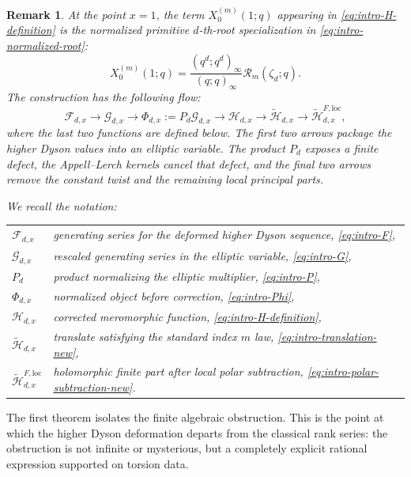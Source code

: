 \documentclass[12pt]{amsart}
\numberwithin{equation}{section}
\newtheorem{remark}{Remark}
\newcommand{\RRm}{\mathcal R}
\begin{document}
\medskip
\begin{remark}
At the point \(x=1\), the term \(X_0^{(m)}(1;q)\) appearing in
\eqref{eq:intro-H-definition} is the normalized primitive
\(d\)-th-root specialization in \eqref{eq:intro-normalized-root}:
\[
X_0^{(m)}(1;q)=
\frac{(q^d;q^d)_\infty}{(q;q)_\infty}\RRm_m(\zeta_d;q).
\]
The construction has the following flow:
\[
\mathcal F_{d,x}
\longrightarrow
\mathcal G_{d,x}
\longrightarrow
\Phi_{d,x}:=P_d\mathcal G_{d,x}
\longrightarrow
\mathcal H_{d,x}
\longrightarrow
\widetilde{\mathcal H}_{d,x}
\longrightarrow
\widetilde{\mathcal H}^{F,\mathrm{loc}}_{d,x},
\]
where the last two functions are defined below.
The first two arrows package the higher Dyson values into an elliptic
variable.  The product \(P_d\) exposes a finite defect, the Appell--Lerch
kernels cancel that defect, and the final two arrows remove the constant twist
and the remaining local principal parts.

We recall the notation:
\begin{center}
\renewcommand{\arraystretch}{1.18}
\begin{tabular}{@{}ll@{}}
\(\mathcal F_{d,x}\) & generating series for the deformed higher Dyson sequence, \eqref{eq:intro-F},\\
\(\mathcal G_{d,x}\) & rescaled generating series in the elliptic variable, \eqref{eq:intro-G},\\
\(P_d\) & product normalizing the elliptic multiplier, \eqref{eq:intro-P},\\
\(\Phi_{d,x}\) & normalized object before correction, \eqref{eq:intro-Phi},\\
\(\mathcal H_{d,x}\) & corrected meromorphic function, \eqref{eq:intro-H-definition},\\
\(\widetilde{\mathcal H}_{d,x}\) & translate satisfying the standard index \(m\) law, \eqref{eq:intro-translation-new},\\
\(\widetilde{\mathcal H}^{F,\mathrm{loc}}_{d,x}\) & holomorphic finite part after local polar subtraction, \eqref{eq:intro-polar-subtraction-new}.
\end{tabular}
\end{center}
\end{remark}

The first theorem isolates the finite algebraic obstruction.  This is the
point at which the higher Dyson deformation departs from the classical rank
series: the obstruction is not infinite or mysterious, but a completely
explicit rational expression supported on torsion data.
\end{document}
